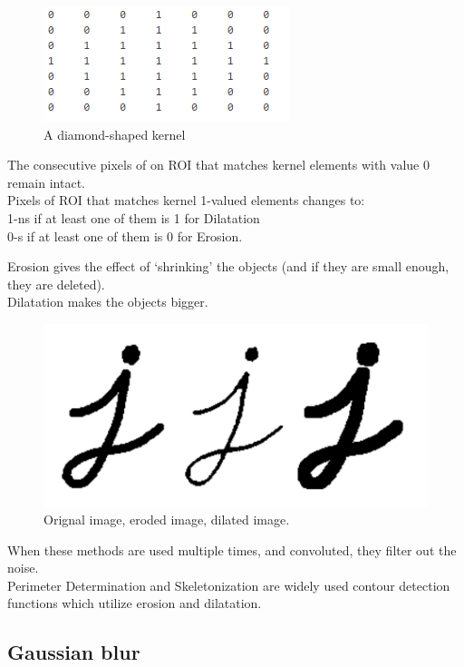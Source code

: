 \documentclass[12pt,twoside,a4paper]{article}
\begin{document}
 
\begin{figure}[H]
\centering
\includegraphics[width=0.4\paperwidth]{diam}
\caption{A diamond-shaped kernel\cite{morph}}
\end{figure}

The consecutive pixels of on ROI that matches kernel elements with value 0 remain intact.\\
Pixels of ROI that matches kernel 1-valued elements changes to:\\
1-ns if at least one of them is 1 for Dilatation\\
0-s if at least one of them is 0 for Erosion.

Erosion gives the effect of ‘shrinking’ the objects (and if they are small enough, they are deleted).\\
Dilatation makes the objects bigger.

 
\begin{figure}[H]
\centering
\includegraphics[width=0.4\paperwidth]{lett}
\caption{Orignal image, eroded image, dilated image.\cite{erdil}}
\end{figure}


When these methods are used multiple times, and convoluted, they filter out the noise.\\
Perimeter Determination and Skeletonization are widely used contour detection functions which utilize erosion and dilatation\cite{erdil}.


\subsection{Gaussian blur}
\end{document}
